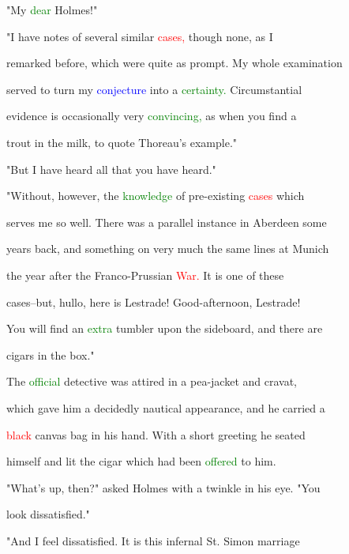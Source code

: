  "My \textcolor{green}{dear} Holmes!"



 "I have notes of several similar \textcolor{red}{cases,} though none, as I

 remarked before, which were quite as prompt. My whole \textcolor{BurntOrange}{examination}

 \textcolor{BurntOrange}{served} to turn my \textcolor{blue}{conjecture} into a \textcolor{green}{certainty.} Circumstantial

 evidence is occasionally very \textcolor{green}{convincing,} as when you find a

 trout in the milk, to \textcolor{BurntOrange}{quote} Thoreau's example."



 "But I have heard all that you have heard."



 "Without, however, the \textcolor{green}{knowledge} of pre-existing \textcolor{red}{cases} which

 serves me so well. There was a parallel instance in Aberdeen some

 years back, and something on very much the same lines at Munich

 the year after the Franco-Prussian \textcolor{red}{War.} It is one of these

 cases--but, hullo, here is Lestrade! Good-afternoon, Lestrade!

 You will find an \textcolor{green}{extra} tumbler upon the sideboard, and there are

 cigars in the box."



 The \textcolor{green}{official} detective was attired in a pea-jacket and cravat,

 which gave him a decidedly nautical appearance, and he carried a

 \textcolor{red}{black} canvas bag in his hand. With a short greeting he seated

 himself and lit the cigar which had been \textcolor{green}{offered} to him.



 "What's up, then?" asked Holmes with a \textcolor{BurntOrange}{twinkle} in his eye. "You

 look dissatisfied."



 "And I feel dissatisfied. It is this infernal St. Simon \textcolor{BurntOrange}{marriage}

